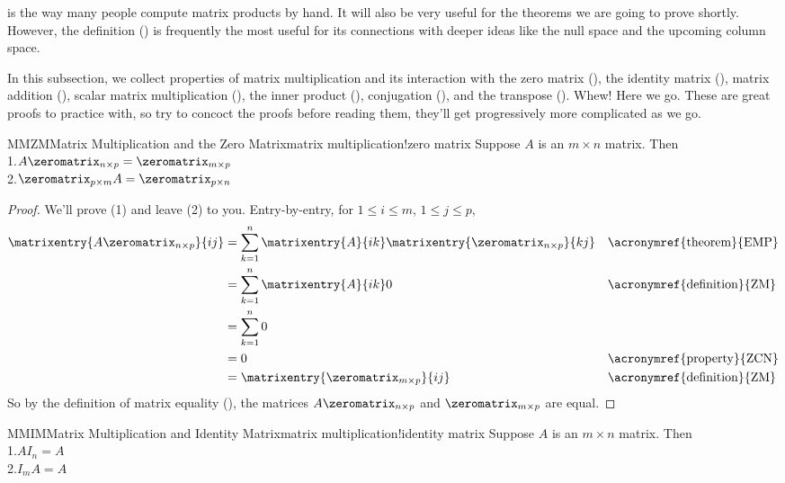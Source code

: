 %
 is the way many people compute matrix products by hand.  It will also be very useful for the theorems we are going to prove shortly.  However, the definition () is frequently the most useful for its connections with deeper ideas like the null space and the upcoming column space.\par
%
%
In this subsection, we collect properties of matrix multiplication and its interaction with 
the zero matrix (),
the identity matrix (),
matrix addition (),
scalar matrix multiplication (),
the inner product (),
conjugation (),
and 
the transpose ().  
Whew!  Here we go.  These are great proofs to practice with, so try to concoct the proofs before reading them, they'll get progressively more complicated as we go.
%
\begin{theorem}{MMZM}{Matrix Multiplication and the Zero Matrix}{matrix multiplication!zero matrix}
Suppose $A$ is an $m\times n$ matrix.  Then\\
1.\quad  $A\zeromatrix_{n\times p}=\zeromatrix_{m\times p}$\\
2.\quad $\zeromatrix_{p\times m}A=\zeromatrix_{p\times n}$
\end{theorem}
%
\begin{proof}
We'll prove (1) and leave (2) to you.  Entry-by-entry, for $1\leq i\leq m$, $1\leq j\leq p$,
%
\begin{align*}
\matrixentry{A\zeromatrix_{n\times p}}{ij}
&=\sum_{k=1}^{n}\matrixentry{A}{ik}\matrixentry{\zeromatrix_{n\times p}}{kj}
&&\text{\acronymref{theorem}{EMP}}\\
%
&=\sum_{k=1}^{n}\matrixentry{A}{ik}0
&&\text{\acronymref{definition}{ZM}}\\
%
&=\sum_{k=1}^{n}0\\
%
&=0
&&\text{\acronymref{property}{ZCN}}\\
%
&=\matrixentry{\zeromatrix_{m\times p}}{ij}
&&\text{\acronymref{definition}{ZM}}
\end{align*}
%
So by the definition of matrix equality (), the matrices $A\zeromatrix_{n\times p}$ and $\zeromatrix_{m\times p}$ are equal.
%
\end{proof}
%
\begin{theorem}{MMIM}{Matrix Multiplication and Identity Matrix}{matrix multiplication!identity matrix}
Suppose $A$ is an $m\times n$ matrix.  Then\\
1.\quad  $AI_n=A$\\
2.\quad  $I_mA=A$
\end{theorem}
